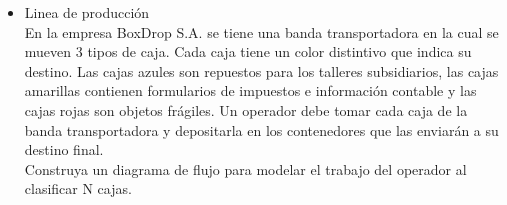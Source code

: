 \begin{itemize}
        \newpage
    \item Linea de producción \\
        En la empresa BoxDrop S.A. se tiene una banda transportadora en la cual se mueven 3 tipos de caja. Cada caja tiene un color distintivo que indica su destino. Las cajas azules son repuestos para los talleres subsidiarios, las cajas amarillas contienen formularios de impuestos e información contable y las cajas rojas son objetos frágiles. Un operador debe tomar cada caja de la banda transportadora y depositarla en los contenedores que las enviarán a su destino final. \\
        Construya un diagrama de flujo para modelar el trabajo del operador al clasificar N cajas.

        
        \newpage
        
\end{itemize}


